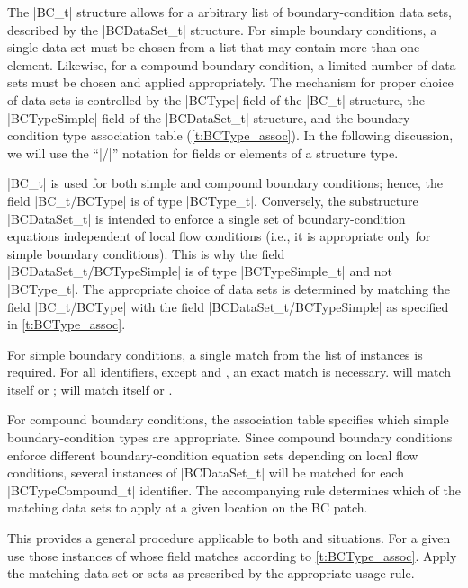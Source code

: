 \enlargethispage{\baselineskip}
The |BC_t| structure allows for a arbitrary list of boundary-condition
data sets, described by the |BCDataSet_t| structure.  For simple
boundary conditions, a single data set must be chosen from a list
that may contain more than one element.  Likewise, for a compound
boundary condition, a limited number of data sets must be chosen
and applied appropriately.  The mechanism for proper choice of data
sets is controlled by the |BCType| field of the |BC_t| structure,
the |BCTypeSimple| field of the |BCDataSet_t| structure, and the
boundary-condition type association table (\autoref{t:BCType_assoc}).
In the following discussion, we will use the ``|/|'' notation for fields
or elements of a structure type.

|BC_t| is used for both simple and compound boundary conditions; hence,
the field |BC_t/BCType| is of type |BCType_t|.
Conversely, the substructure |BCDataSet_t| is intended to enforce a
single set of boundary-condition equations independent of local flow
conditions (i.e., it is appropriate only for simple boundary conditions).
This is why the field |BCDataSet_t/BCTypeSimple| is of type
|BCTypeSimple_t| and not |BCType_t|.
The appropriate choice of data sets is determined by matching the field
|BC_t/BCType| with the field |BCDataSet_t/BCTypeSimple| as specified in 
\autoref{t:BCType_assoc}.

For simple boundary conditions, a single match from the list of
 instances is required.
For all  identifiers, except
 and , an exact match
is necessary.
 will match itself or ;
 will match itself or .

For compound boundary conditions, the association table specifies which
simple boundary-condition types are appropriate.
Since compound boundary conditions enforce different boundary-condition
equation sets depending on local flow conditions, several instances of
|BCDataSet_t| will be matched for each |BCTypeCompound_t| identifier.
The accompanying rule determines which of the matching data sets to
apply at a given location on the BC patch.

This provides a general procedure applicable to both 
and  situations.
For a given  use those instances of 
whose field  matches according to
\autoref{t:BCType_assoc}.
Apply the matching data set or sets as prescribed by the appropriate
usage rule.

